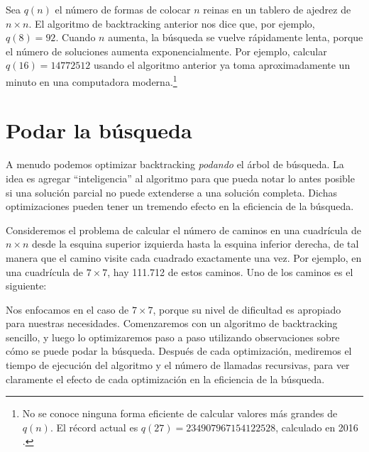 Sea $q(n)$ el número de formas de
colocar $n$ reinas en un tablero de ajedrez de $n \times n$.
El algoritmo de backtracking anterior nos dice que, por ejemplo, $q(8)=92$.
Cuando $n$ aumenta, la búsqueda se vuelve rápidamente lenta,
porque el número de soluciones aumenta
exponencialmente.
Por ejemplo, calcular $q(16)=14772512$
usando el algoritmo anterior ya toma aproximadamente un minuto
en una computadora moderna.\footnote{No se conoce ninguna forma eficiente de
  calcular valores más grandes de $q(n)$. El récord actual es
  $q(27)=234907967154122528$, calculado en 2016 \cite{q27}.}

\newpage
\section{Podar la búsqueda}

A menudo podemos optimizar backtracking \emph{podando} el árbol de búsqueda.
La idea es agregar ``inteligencia'' al algoritmo
para que pueda notar lo antes posible
si una solución parcial no puede extenderse
a una solución completa.
Dichas optimizaciones pueden tener un tremendo
efecto en la eficiencia de la búsqueda.

Consideremos el problema
de calcular el número de caminos
en una cuadrícula de $n \times n$ desde la esquina superior izquierda
hasta la esquina inferior derecha, de tal manera que
el camino visite cada cuadrado exactamente una vez.
Por ejemplo, en una cuadrícula de $7 \times 7$,
hay 111.712 de estos caminos.
Uno de los caminos es el siguiente:

\begin{center}
\end{center}

Nos enfocamos en el caso de $7 \times 7$,
porque su nivel de dificultad es apropiado para nuestras necesidades.
Comenzaremos con un algoritmo de backtracking sencillo,
y luego lo optimizaremos paso a paso utilizando observaciones
sobre cómo se puede podar la búsqueda.
Después de cada optimización, mediremos el tiempo de ejecución
del algoritmo y el número de llamadas recursivas,
para ver claramente el efecto de cada
optimización en la eficiencia de la búsqueda.

